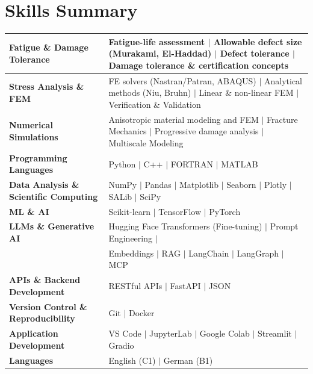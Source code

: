\documentclass[a4paper,20pt]{article}
\begin{document}
\section{\color{blue}Skills Summary}
\begin{tabular}{|p{8cm}p{10.5cm}|}

\hline
\textbf{Fatigue \& Damage Tolerance} &
Fatigue-life assessment \(\vert\) Allowable defect size (Murakami, El-Haddad) \(\vert\) Defect tolerance \(\vert\) Damage tolerance \& certification concepts \\

\hline
\textbf{Stress Analysis \& FEM} &
FE solvers (Nastran/Patran, ABAQUS) \(\vert\) Analytical methods (Niu, Bruhn) \(\vert\) Linear \& non-linear FEM \(\vert\) Verification \& Validation \\

\hline
\textbf{Numerical Simulations} &
Anisotropic material modeling and FEM  \(\vert\) Fracture Mechanics  \(\vert\) Progressive damage analysis \(\vert\) Multiscale Modeling \\

\hline
\textbf{ Programming Languages} &
Python  \(\vert\) C++ \(\vert\) FORTRAN \(\vert\) MATLAB \\
\hline

\textbf{ Data Analysis \& Scientific Computing} &
NumPy \(\vert\) Pandas \(\vert\) Matplotlib \(\vert\) Seaborn \(\vert\) Plotly \(\vert\) SALib \(\vert\) SciPy \\
\hline

\textbf{ ML \& AI} &
Scikit-learn \(\vert\) TensorFlow \(\vert\) PyTorch \\
\hline

\textbf{LLMs \& Generative AI} &
Hugging Face Transformers (Fine-tuning) \(\vert\) Prompt Engineering \(\vert\) \\ & Embeddings \(\vert\) RAG \(\vert\) LangChain \(\vert\) LangGraph \(\vert\) MCP \\

\hline

\textbf{ APIs \& Backend Development} &
RESTful APIs \(\vert\) FastAPI \(\vert\) JSON\\
\hline


\textbf{ Version Control \& Reproducibility} &
Git \(\vert\) Docker \\
\hline

\textbf{ Application Development} &
VS Code \(\vert\) JupyterLab \(\vert\) Google Colab \(\vert\) Streamlit \(\vert\) Gradio\\
\hline
\textbf{ Languages} &
English (C1) \(\vert\) German (B1) \\
\hline
\end{tabular}
\end{document}
